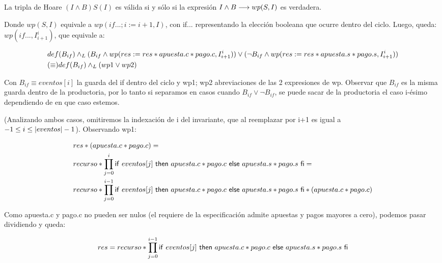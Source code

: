 \documentclass[10pt,a4paper]{article}
\begin{document}
 La tripla de Hoare $(I \land B)S(I)$ es válida si y sólo si la expresión
 $I \land B \longrightarrow wp(S,I)$ es verdadera.
   
\vspace{0.3cm}
   
 Donde $wp(S,I)$ equivale a $wp(if...; i:= i + 1, I)$, con if... representando la elección booleana que ocurre dentro del ciclo.
 Luego, queda: $wp(if..., I^{i}_{i+1})$, que equivale a:
   
\begin{equation}
\begin{split}
	& def(B_{if}) \land _L ( B_{if} \land wp(res:= res*apuesta.c*pago.c , I^{i}_{i+1})) \lor 
	(\neg B_{if} \land wp(res:= res*apuesta.s*pago.s , I^{i}_{i+1}))\\
	& (\equiv) def(B_{if}) \land _L (wp1 \lor wp2)
\end{split}
\end{equation}
   
 Con $B_{if} \equiv eventos[i]$ la guarda del if dentro del ciclo y 
 wp1; wp2 abreviaciones de las 2 expresiones de wp. 
 Observar que $B_{if}$ es la misma guarda dentro de la productoria,
 por lo tanto si separamos en casos cuando $B_{if} \lor \neg B_{if}$,
 se puede sacar de la productoria el caso i-ésimo dependiendo de en que caso estemos.
   
\vspace{0.3cm}
	
 (Analizando ambos casos, omitiremos la indexación de i del invariante, que al reemplazar por i+1 es igual a\\
 $-1 \leq i \leq |eventos| - 1$).
 Observando wp1:
   
\begin{equation}
\begin{split}
	& res * (apuesta.c * pago.c) =\\
	& recurso * \prod\limits_{j=0}^{i} \mathsf{if}\ eventos[j]\ \mathsf{then}\ apuesta.c * pago.c\ \mathsf{else}\ apuesta.s * pago.s\ \mathsf{fi} =\\
	& recurso * \prod\limits_{j=0}^{i-1} \mathsf{if}\ eventos[j]\ \mathsf{then}\ apuesta.c * pago.c\ \mathsf{else}\ apuesta.s * pago.s\ \mathsf{fi} * (apuesta.c * pago.c) 
\end{split}
\end{equation}
   
 Como apuesta.c y pago.c no pueden ser nulos (el requiere de la especificación admite apuestas y pagos mayores a cero), podemos pasar dividiendo y queda:
   
\begin{equation}
	res = recurso * \prod\limits_{j=0}^{i-1} \mathsf{if}\ eventos[j]\ \mathsf{then}\ apuesta.c * pago.c\ \mathsf{else}\ apuesta.s * pago.s\ \mathsf{fi}
\end{equation}
   
\end{document}
